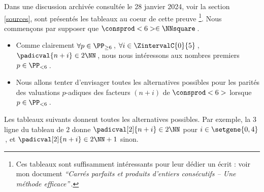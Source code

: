 Dans une discussion archivée consultée le 28 janvier 2024, voir la section \ref{sources}, sont présentés les tableaux au coeur de cette preuve
\footnote{
	Ces tableaux sont suffisamment intéressants pour leur dédier un écrit : voir mon document \emph{\enquote{Carrés parfaits et produits d'entiers consécutifs -- Une méthode efficace}}\,.
}.
Nous commençons par supposer que $\consprod<6> \in \NNsquare$\,.
%
\begin{itemize}
	\item  Comme clairement
    $\forall p \in \PP_{\geq 6}$\,, 
    $\forall i \in \ZintervalC{0}{5}$\,, 
    $\padicval{n + i} \in 2 \NN$\,,
    nous nous intéressons aux nombres premiers $p \in \PP_{< 6}$\,.

    \item Nous allons tenter d'envisager toutes les alternatives possibles pour les parités des valuations $p$-adiques des facteurs $(n + i)$ de $\consprod<6>$ lorsque $p \in \PP_{< 6}$\,.
\end{itemize}


Les tableaux suivants donnent toutes les alternatives possibles.
Par exemple, la 3\ieme{} ligne du tableau de $2$ donne $\padicval[2]{n + i} \in 2 \NN$ pour $i \in \setgene{0, 4}$\,,
et $\padicval[2]{n + i} \in 2 \NN + 1$ sinon.

